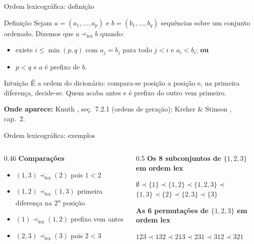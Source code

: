 \documentclass[aspectratio=169]{beamer}
\newcommand{\lex}{\prec_{\text{lex}}}
\newcommand{\fonte}[1]{%
  \par\vspace{1pt}%
  {\tiny\color{gray!30!black}\textbf{Onde aparece:} #1\par}}
\begin{document}
\begin{frame}{Ordem lexicográfica: definição}
  \begin{block}{Definição}
    Sejam $a = (a_1,\dots,a_p)$ e $b = (b_1,\dots,b_q)$ sequências sobre um
    conjunto ordenado. Dizemos que $a \lex b$ quando:
    \begin{itemize}
      \item existe $i \le \min(p,q)$ com $a_j = b_j$ para todo $j < i$ e $a_i < b_i$; \textbf{ou}
      \item $p < q$ e $a$ é prefixo de $b$.
    \end{itemize}
  \end{block}
  \begin{exampleblock}{Intuição}
    É a ordem do dicionário: compara-se posição a posição e, na primeira
    diferença, decide-se. Quem acaba antes e é prefixo do outro vem primeiro.
  \end{exampleblock}
  \fonte{Knuth \cite{knuth2011taocp4a}, seç.~7.2.1 (ordens de geração);
    Kreher \& Stinson \cite{kreher1999combinatorial}, cap.~2.}
\end{frame}

\begin{frame}{Ordem lexicográfica: exemplos}
  \begin{columns}[T]
    \begin{column}{0.46\textwidth}
      \textbf{Comparações}
      \begin{itemize}
        \item $(1,3) \lex (2)$ \quad pois $1 < 2$
        \item $(1,2) \lex (1,3)$ \quad primeira diferença na 2\textsuperscript{a} posição
        \item $(1) \lex (1,2)$ \quad prefixo vem antes
        \item $(2,3) \lex (3)$ \quad pois $2 < 3$
      \end{itemize}
    \end{column}
    \begin{column}{0.5\textwidth}
      \textbf{Os 8 subconjuntos de $\{1,2,3\}$ em ordem lex}
      \begin{center}\small
        $\emptyset \prec \{1\} \prec \{1,2\} \prec \{1,2,3\} \prec$\\
        $\{1,3\} \prec \{2\} \prec \{2,3\} \prec \{3\}$
      \end{center}
      \textbf{As 6 permutações de $\{1,2,3\}$ em ordem lex}
      \begin{center}\small
        $123 \prec 132 \prec 213 \prec 231 \prec 312 \prec 321$
      \end{center}
    \end{column}
  \end{columns}
\end{frame}
\end{document}
